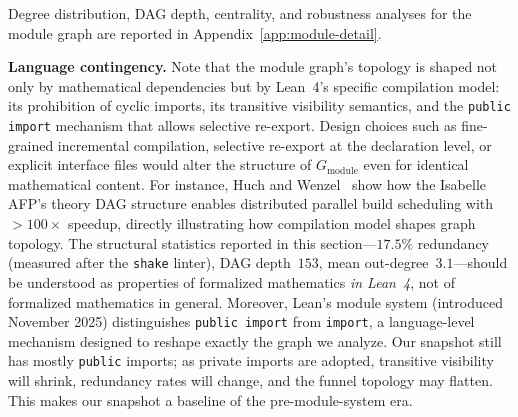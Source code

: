 Degree distribution, DAG depth, centrality, and robustness analyses for the module graph are reported in Appendix~\ref{app:module-detail}.

\noindent\textbf{Language contingency.}
\label{rem:language-contingency}
Note that the module graph's topology is shaped not only by mathematical dependencies but by Lean~4's specific compilation model: its prohibition of cyclic imports, its transitive visibility semantics, and the \texttt{public import} mechanism that allows selective re-export. Design choices such as fine-grained incremental compilation, selective re-export at the declaration level, or explicit interface files would alter the structure of $G_{\mathrm{module}}$ even for identical mathematical content. For instance, Huch and Wenzel~\cite{huch2024} show how the Isabelle AFP's theory DAG structure enables distributed parallel build scheduling with ${>}100\times$ speedup, directly illustrating how compilation model shapes graph topology. The structural statistics reported in this section---$17.5\%$ redundancy (measured after the \texttt{shake} linter), DAG depth~$153$, mean out-degree~$3.1$---should be understood as properties of formalized mathematics \emph{in Lean~4}, not of formalized mathematics in general. Moreover, Lean's module system (introduced November 2025) distinguishes \texttt{public import} from \texttt{import}, a language-level mechanism designed to reshape exactly the graph we analyze. Our snapshot still has mostly \texttt{public} imports; as private imports are adopted, transitive visibility will shrink, redundancy rates will change, and the funnel topology may flatten. This makes our snapshot a baseline of the pre-module-system era.


